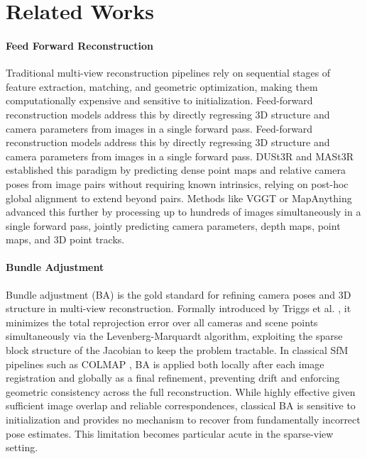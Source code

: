 \section{Related Works}
\paragraph{Feed Forward Reconstruction}
Traditional multi-view reconstruction pipelines \cite{Lowe:2004:DIF:993451.996342, Hartley2003, schoenberger2016sfm} rely on sequential stages of feature extraction, matching, and geometric optimization, making them computationally expensive and sensitive to initialization. Feed-forward reconstruction models address this by directly regressing 3D structure and camera parameters from images in a single forward pass.
Feed-forward reconstruction models address this by directly regressing 3D structure and camera parameters from images in a single forward pass. DUSt3R \cite{wang2024dust3rgeometric3dvision}and MASt3R \cite{leroy2024groundingimagematching3d} established this paradigm by predicting dense point maps and relative camera poses from image pairs without requiring known intrinsics, relying on post-hoc global alignment to extend beyond pairs. Methods like VGGT \cite{wang2025vggtvisualgeometrygrounded} or MapAnything \cite{keetha2026mapanythinguniversalfeedforwardmetric} advanced this further by processing up to hundreds of images simultaneously in a single forward pass, jointly predicting camera parameters, depth maps, point maps, and 3D point tracks.
\paragraph{Bundle Adjustment}
Bundle adjustment (BA) is the gold standard for refining camera poses and 3D structure in multi-view reconstruction. Formally introduced by Triggs et al. \cite{10.1007/3-540-44480-7_21}, it minimizes the total reprojection error over all cameras and scene points simultaneously via the Levenberg-Marquardt algorithm, exploiting the sparse block structure of the Jacobian to keep the problem tractable. In classical SfM pipelines such as COLMAP \cite{schoenberger2016sfm}, BA is applied both locally after each image registration and globally as a final refinement, preventing drift and enforcing geometric consistency across the full reconstruction. While highly effective given sufficient image overlap and reliable correspondences, classical BA is sensitive to initialization and provides no mechanism to recover from fundamentally incorrect pose estimates. This limitation becomes particular acute in the sparse-view setting.

